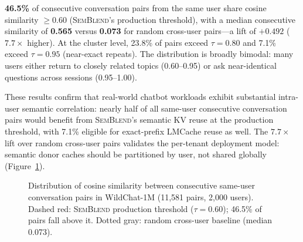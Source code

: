 \documentclass[10pt,twocolumn]{article}
\newcommand{\semblend}{\textsc{SemBlend}\xspace}
\begin{document}
\textbf{46.5\%} of consecutive conversation pairs from the same user
share cosine similarity $\geq 0.60$ (\semblend's production threshold),
with a median consecutive similarity of \textbf{0.565}
versus \textbf{0.073} for random cross-user pairs---a lift of
$\boldsymbol{+0.492}$ ($7.7\times$ higher). At the cluster level,
23.8\% of pairs exceed $\tau{=}0.80$ and 7.1\% exceed $\tau{=}0.95$
(near-exact repeats). The distribution is broadly bimodal: many users
either return to closely related topics (0.60--0.95) or ask
near-identical questions across sessions (0.95--1.00).

These results confirm that real-world chatbot workloads exhibit
substantial intra-user semantic correlation: nearly half of all
same-user consecutive conversation pairs would benefit from
\semblend's semantic KV reuse at the production threshold,
with 7.1\% eligible for exact-prefix LMCache reuse as well.
The $7.7\times$ lift over random cross-user pairs validates the
per-tenant deployment model: semantic donor caches should be
partitioned by user, not shared globally
(Figure~\ref{fig:wildchat-hist}).

\begin{figure}[t]
\centering
{}
\caption{Distribution of cosine similarity between consecutive same-user
conversation pairs in WildChat-1M (11,581 pairs, 2,000 users).
Dashed red: \semblend production threshold ($\tau{=}0.60$); 46.5\% of pairs
fall above it. Dotted gray: random cross-user baseline (median 0.073).}
\label{fig:wildchat-hist}
\end{figure}
\end{document}
